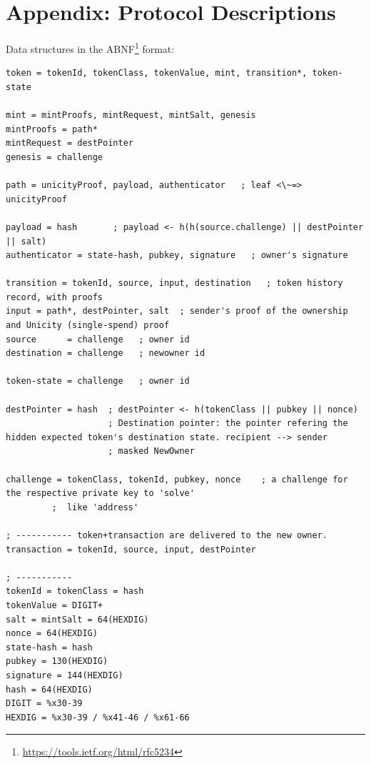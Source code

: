 \section{Appendix: Protocol Descriptions}

Data structures in the ABNF\footnote{\url{https://tools.ietf.org/html/rfc5234}} format:

\begin{lstlisting}[language=abnf]
token = tokenId, tokenClass, tokenValue, mint, transition*, token-state

mint = mintProofs, mintRequest, mintSalt, genesis
mintProofs = path*
mintRequest = destPointer
genesis = challenge

path = unicityProof, payload, authenticator   ; leaf <\~=> unicityProof

payload = hash       ; payload <- h(h(source.challenge) || destPointer || salt)
authenticator = state-hash, pubkey, signature   ; owner's signature

transition = tokenId, source, input, destination   ; token history record, with proofs
input = path*, destPointer, salt  ; sender's proof of the ownership and Unicity (single-spend) proof
source      = challenge   ; owner id
destination = challenge   ; newowner id

token-state = challenge   ; owner id

destPointer = hash  ; destPointer <- h(tokenClass || pubkey || nonce)
                    ; Destination pointer: the pointer refering the hidden expected token's destination state. recipient --> sender
                    ; masked NewOwner

challenge = tokenClass, tokenId, pubkey, nonce    ; a challenge for the respective private key to 'solve'
         ;  like 'address'

; ----------- token+transaction are delivered to the new owner.
transaction = tokenId, source, input, destPointer

; -----------
tokenId = tokenClass = hash
tokenValue = DIGIT+
salt = mintSalt = 64(HEXDIG)
nonce = 64(HEXDIG)
state-hash = hash
pubkey = 130(HEXDIG)
signature = 144(HEXDIG)
hash = 64(HEXDIG)
DIGIT = %x30-39
HEXDIG = %x30-39 / %x41-46 / %x61-66
\end{lstlisting}




